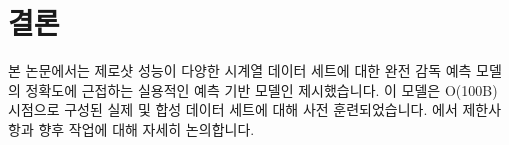 \documentclass{article}
\begin{document}



\section{결론}
본 논문에서는 제로샷 성능이 다양한 시계열 데이터 세트에 대한 완전 감독 예측 모델의 정확도에 근접하는 실용적인 예측 기반 모델인  제시했습니다. 이 모델은 O(100B) 시점으로 구성된 실제 및 합성 데이터 세트에 대해 사전 훈련되었습니다. 에서 제한사항과 향후 작업에 대해 자세히 논의합니다.
\end{document}
